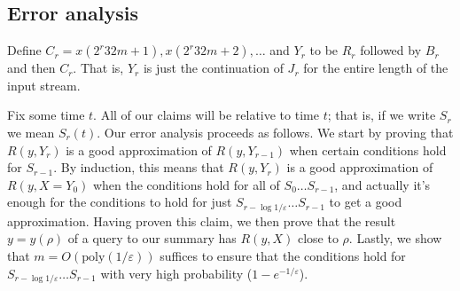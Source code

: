 \documentclass{article}
\theoremstyle{plain}
\def\ep{\varepsilon}
\def\pl{\!+\!}
\def\eq{\!=\!}
\newcommand{\p}[1]{(#1)}
\newcommand{\OO}[1]{O\p{#1}}
\newcommand{\poly}[1]{\text{poly}\p{#1}}
\newcommand{\rank}[2]{R\p{#1,#2}}
\begin{document}
\subsection{Error analysis}
\label{sec:online-error}

Define $C_r = x\p{2^r 32 m \pl 1}, x\p{2^r 32 m \pl 2}, \ldots$ and $Y_r$ to be
$R_r$ followed by $B_r$ and then $C_r$. That is, $Y_r$ is just the continuation
of $J_r$ for the entire length of the input stream.

Fix some time $t$. All of our claims will be relative to time $t$; that is, if
we write $S_r$ we mean $S_r\p{t}$. Our error analysis proceeds as follows. We
start by proving that $\rank{y}{Y_r}$ is a good approximation of
$\rank{y}{Y_{r-1}}$ when certain conditions hold for $S_{r-1}$. By induction,
this means that $\rank{y}{Y_r}$ is a good approximation of $\rank{y}{X \eq Y_0}$
when the conditions hold for all of $S_0 \ldots S_{r-1}$, and actually it's
enough for the conditions to hold for just $S_{r - \log 1/\ep} \ldots S_{r-1}$
to get a good approximation. Having proven this claim, we then prove that the
result $y = y\p{\rho}$ of a query to our summary has $\rank{y}{X}$ close to
$\rho$. Lastly, we show that $m = \OO{\poly{1/\ep}}$ suffices to ensure that the
conditions hold for $S_{r - \log 1/\ep} \ldots S_{r-1}$ with very high
probability ($1 - e^{-1/\ep}$).
\end{document}
